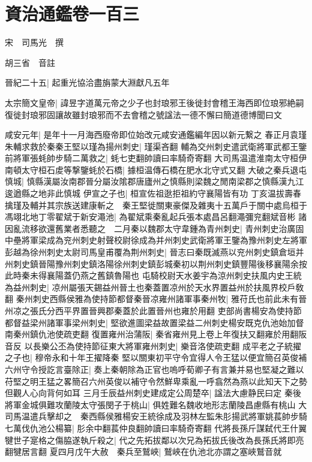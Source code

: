 \section{資治通鑑卷一百三}
宋　司馬光　撰

胡三省　音註

晉紀二十五|{
	起重光協洽盡旃蒙大淵獻凡五年}


太宗簡文皇帝|{
	諱昱字道萬元帝之少子也封琅邪王後徙封會稽王海西即位琅邪絶嗣復徙封琅邪固讓故雖封琅邪而不去會稽之號諡法一德不懈曰簡道德博聞曰文}


咸安元年|{
	是年十一月海西廢帝即位始改元咸安通鑑編年因以新元繋之}
春正月袁瑾朱輔求救於秦秦王堅以瑾為揚州刺史|{
	瑾渠吝翻}
輔為交州刺史遣武衛將軍武都王鑒前將軍張蚝帥步騎二萬救之|{
	蚝七吏翻帥讀曰率騎奇寄翻}
大司馬温遣淮南太守桓伊南頓太守桓石䖍等撃鑒蚝於石橋|{
	據桓温傳石橋在肥水北守式又翻}
大破之秦兵退屯慎城|{
	慎縣漢屬汝南郡晉分屬汝隂郡唐廬州之慎縣則梁魏之閒南梁郡之慎縣漢九江逡遒縣之地非此慎城}
伊宣之子也|{
	桓宣佐祖逖拒祖約守襄陽皆有功}
丁亥温拔壽春擒瑾及輔并其宗族送建康斬之　秦王堅徙關東豪傑及雜夷十五萬戶于關中處烏桓于馮翊北地丁零翟斌于新安澠池|{
	為翟斌乘秦亂起兵張本處昌呂翻澠彌兖翻斌音彬}
諸因亂流移欲還舊業者悉聽之　二月秦以魏郡太守韋鍾為青州刺史|{
	青州刺史治廣固}
中壘將軍梁成為兖州刺史射聲校尉徐成為并州刺史武衛將軍王鑒為豫州刺史左將軍彭越為徐州刺史太尉司馬皇甫覆為荆州刺史|{
	晉志曰秦既滅燕以兖州刺史鎮倉垣并州刺史鎮晉陽豫州刺史鎮洛陽徐州刺史鎮彭城秦初以荆州刺史鎮豐陽後移襄陽余按此時秦未得襄陽蓋仍燕之舊鎮魯陽也}
屯騎校尉天水姜宇為涼州刺史扶風内史王統為益州刺史|{
	凉州屬張天錫益州晉土也秦蓋置凉州於天水界置益州於扶風界校戶敎翻}
秦州刺史西縣侯雅為使持節都督秦晉凉雍州諸軍事秦州牧|{
	雅苻氏也前此未有晉州凉之張氏分西平界置晉興郡秦蓋於此置晉州也雍於用翻}
吏部尚書楊安為使持節都督益梁州諸軍事梁州刺史|{
	堅欲進圖梁益故置梁益二州刺史楊安既克仇池始加督南秦州鎮仇池使疏吏翻}
復置雍州治蒲阪|{
	秦省雍州見上卷上年復扶又翻雍於用翻阪音反}
以長樂公丕為使持節征東大將軍雍州刺史|{
	樂音洛使疏吏翻}
成平老之子統擢之子也|{
	穆帝永和十年王擢降秦}
堅以關東初平守令宜得人令王猛以便宜簡召英俊補六州守令授訖言臺除正|{
	奏上秦朝除為正官也嗚呼荀卿子有言兼并易也堅凝之難以苻堅之明王猛之畧簡召六州英俊以補守令然鮮卑乘亂一呼翕然為燕以此知天下之勢但觀人心向背何如耳}
三月壬辰益州刺史建成定公周楚卒|{
	諡法大慮静民曰定}
秦後將軍金城俱難攻蘭陵太守張閔子于桃山|{
	俱姓難名魏收地形志蘭陵昌慮縣有桃山}
大司馬温遣兵擊却之　秦西縣侯雅楊安王統徐成及羽林左監朱肜揚武將軍姚萇帥步騎七萬伐仇池公楊纂|{
	肜余中翻萇仲良翻帥讀曰率騎奇寄翻}
代將長孫斤謀弑代王什翼犍世子寔格之傷脇遂執斤殺之|{
	代之先拓拔鄰以次兄為拓拔氏後改為長孫氏將即亮翻犍居言翻}
夏四月戊午大赦　秦兵至鷲峽|{
	鷲峽在仇池北亦謂之塞峽鷲音就}
